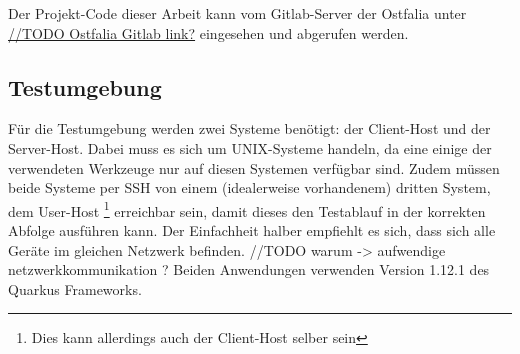 Der Projekt-Code dieser Arbeit kann vom Gitlab-Server der Ostfalia unter
\url{//TODO Ostfalia Gitlab link?} eingesehen und abgerufen werden.

\subsection{Testumgebung}
\label{section:testumgebung}
Für die Testumgebung werden zwei Systeme benötigt: der Client-Host und der Server-Host.
Dabei muss es sich um UNIX-Systeme handeln, da eine einige der verwendeten Werkzeuge nur
auf diesen Systemen verfügbar sind.
Zudem müssen beide Systeme per SSH von einem (idealerweise vorhandenem) dritten System, dem User-Host
\footnote{Dies kann allerdings auch der Client-Host selber sein}
erreichbar sein, damit dieses den Testablauf in der korrekten Abfolge ausführen kann.
Der Einfachheit halber empfiehlt es sich, dass sich alle Geräte im gleichen Netzwerk befinden.
//TODO warum -> aufwendige netzwerkkommunikation ?
Beiden Anwendungen verwenden Version 1.12.1 des Quarkus Frameworks.

